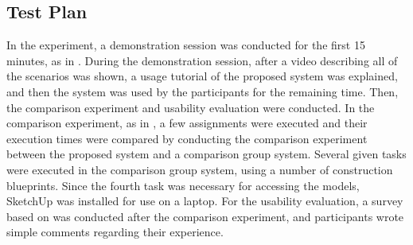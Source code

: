 \subsection{Test Plan}

In the experiment, a demonstration session was conducted for the first 15 minutes, as in \cite{song_penlight:_2009}. During the demonstration session, after a video describing all of the scenarios was shown, a usage tutorial of the proposed system was explained, and then the system was used by the participants for the remaining time. Then, the comparison experiment and usability evaluation were conducted. In the comparison experiment, as in \cite{yeh_-site_2012}, a few assignments were executed and their execution times were compared by conducting the comparison experiment between the proposed system and a comparison group system. Several given tasks were executed in the comparison group system, using a number of construction blueprints. Since the fourth task was necessary for accessing the models, SketchUp was installed for use on a laptop. For the usability evaluation, a survey based on \cite{davis_perceived_1989} was conducted after the comparison experiment, and participants wrote simple comments regarding their experience.

